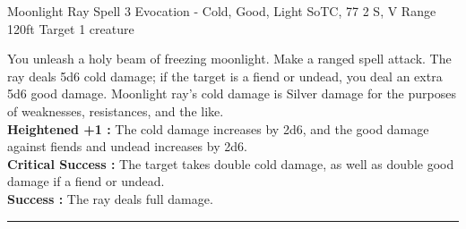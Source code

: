 \documentclass{article}
\begin{document}
\begin{spell}
{Moonlight Ray} %
{Spell 3} %
{Evocation - Cold, Good, Light} %
{SoTC, 77} %
{2} %
{S, V} %
{Range} {120ft}
{} {}
{Target} {1 creature}
{} {}
    \begingroup
        \singlespacing
        \begin{singlespace*}
        \par\fontsize{9}{10pt}\selectfont
        \vspace{7mm}   %
        You unleash a holy beam of freezing moonlight. Make a ranged spell attack. The ray deals 5d6 cold damage; if the target is a fiend or undead, you deal an extra 5d6 good damage. Moonlight ray's cold damage is Silver damage for the purposes of weaknesses, resistances, and the like.\\
        
         \vspace{2mm}
         \textbf{Heightened +1 :} The cold damage increases by 2d6, and the good damage against fiends and undead increases by 2d6.\\


         \vspace{2mm}
         \textbf{Critical Success :} The target takes double cold damage, as well as double good damage if a fiend or undead.\\
         \textbf{Success :} The ray deals full damage.\\
        \rule{\textwidth}{0.5pt}
        \end{singlespace*}
    \endgroup
\end{spell}
\end{document}
